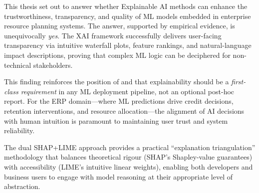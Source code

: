 \documentclass[12pt,a4paper]{report}
\begin{document}
This thesis set out to answer whether Explainable AI methods can enhance the trustworthiness, transparency, and quality of ML models embedded in enterprise resource planning systems. The answer, supported by empirical evidence, is unequivocally \textit{yes}. The XAI framework successfully delivers user-facing transparency via intuitive waterfall plots, feature rankings, and natural-language impact descriptions, proving that complex ML logic can be deciphered for non-technical stakeholders.

This finding reinforces the position of \citet{lundberg2020local} and \citet{rudin2019stop} that explainability should be a \textit{first-class requirement} in any ML deployment pipeline, not an optional post-hoc report. For the ERP domain---where ML predictions drive credit decisions, retention interventions, and resource allocation---the alignment of AI decisions with human intuition is paramount to maintaining user trust and system reliability.

The dual SHAP+LIME approach provides a practical ``explanation triangulation'' methodology that balances theoretical rigour (SHAP's Shapley-value guarantees) with accessibility (LIME's intuitive linear weights), enabling both developers and business users to engage with model reasoning at their appropriate level of abstraction.




\end{document}
